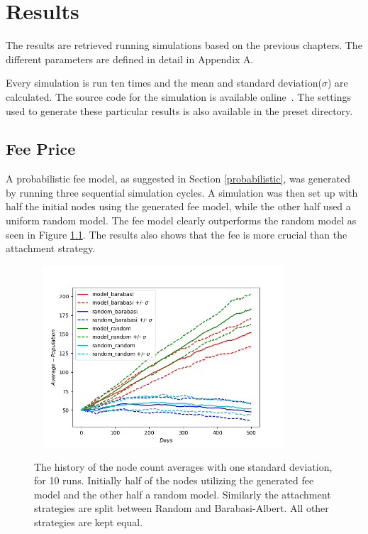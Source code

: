 \chapter{Results}

The results are retrieved running simulations based on the previous chapters. The different parameters are defined in detail in Appendix A.

Every simulation is run ten times and the mean and standard deviation($\sigma$) are calculated. The source code for the simulation is available online~\cite{repository:me:thesis}. The settings used to generate these particular results is also available in the preset directory. 


\section{Fee Price}

A probabilistic fee model, as suggested in Section \ref{probabilistic}, was generated by running three sequential simulation cycles. A simulation was then set up with half the initial nodes using the generated fee model, while the other half used a uniform random model. The fee model clearly outperforms the random model as seen in Figure \ref{fig:history_price}. The results also shows that the fee is more crucial than the attachment strategy. 

\begin{figure}[!htb]

	\hspace*{-0.5cm}\ 
	\centering
	\includegraphics[width=9cm]{images/histories_deviation_price.png}
	\caption{ The history of the node count averages with one standard deviation, for 10 runs. Initially half of the nodes utilizing the generated fee model and the other half a random model. Similarly the attachment strategies are split between Random and Barabasi-Albert. All other strategies are kept equal.
	}
	\label{fig:history_price}
	\hspace*{2mm}
\end{figure}

